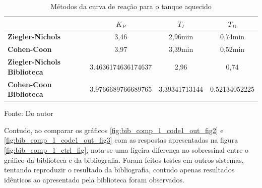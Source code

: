 \begin{table}[h]
    \begin{center}
        \begin{tabular}{ | l | c | c | c | }
            \hline
            {}                                    & {$K_P$}              & {$T_I$}         & {$T_D$}         \\
            \hline
            {\textbf{Ziegler-Nichols}}            & {3,46}               & {2,96min}       & {0,74min}       \\
            \hline
            {\textbf{Cohen-Coon}}                 & {3,97}               & {3,39min}       & {0,52min}       \\
            \hline
            {\textbf{Ziegler-Nichols Biblioteca}} & {3.4636174636174637} & {2,96}          & {0,74}          \\
            \hline
            {\textbf{Cohen-Coon Biblioteca}}      & {3.9766689766689765} & {3.39341713144} & {0.52134052225} \\
            \hline
        \end{tabular}
        \caption{ Métodos da curva de reação para o tanque aquecido}
        \vspace{0cm}\hspace{0cm}\small{Fonte: Do autor}
        \label{tab:bib_comp_1_pid_comp}
    \end{center}
\end{table}

Contudo, ao comparar os gráficos \ref{fig:bib_comp_1_code1_out_fig2} e \ref{fig:bib_comp_1_code1_out_fig3} com as
respostas apresentadas na figura \ref{fig:bib_comp_1_ctrl_fig},
nota-se uma ligeira diferença no sobressinal entre o gráfico da biblioteca e da bibliografia.
Foram feitos testes em outros sistemas, tentando reproduzir o resultado da bibliografia, contudo apenas resultados
idênticos ao apresentado pela biblioteca foram observados.

